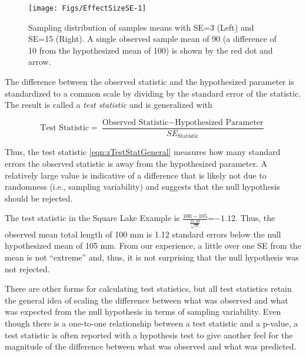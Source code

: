 \documentclass[10pt,openany]{book}\usepackage[]{graphicx}\usepackage[]{color}
\newenvironment{knitrout}{}{} %
\begin{document}
\begin{knitrout}
\color{fgcolor}\begin{figure}[hbtp]

{\centering \texttt{[image: Figs/EffectSizeSE-1]} 

}

\caption[Sampling distribution of samples means with SE=3 (Left) and SE=15 (Right)]{Sampling distribution of samples means with SE=3 (Left) and SE=15 (Right). A single observed sample mean of 90 (a difference of 10 from the hypothesized mean of 100) is shown by the red dot and arrow.}\label{fig:EffectSizeSE}
\end{figure}


\end{knitrout}

The difference between the observed statistic and the hypothesized parameter is  standardized to a common scale by dividing by the standard error of the statistic. The result is called a \emph{test statistic} and is generalized with

\begin{equation}  \label{eqn:zTestStatGeneral}
  \text{Test Statistic} = \frac{\text{Observed Statistic}-\text{Hypothesized Parameter}}{SE_{\text{Statistic}}}
\end{equation}

Thus, the test statistic \eqref{eqn:zTestStatGeneral} measures how many standard errors the observed statistic is away from the hypothesized parameter. A relatively large value is indicative of a difference that is likely not due to randomness (i.e., sampling variability) and suggests that the null hypothesis should be rejected.

The test statistic in the Square Lake Example is $\frac{100-105}{\frac{31.49}{\sqrt{50}}}$=$-1.12$. Thus, the observed mean total length of 100 mm is 1.12 standard errors below the null hypothesized mean of 105 mm. From our experience, a little over one SE from the mean is not ``extreme'' and, thus, it is not surprising that the null hypothesis was not rejected.

There are other forms for calculating test statistics, but all test statistics retain the general idea of scaling the difference between what was observed and what was expected from the null hypothesis in terms of sampling variability. Even though there is a one-to-one relationship between a test statistic and a p-value, a test statistic is often reported with a hypothesis test to give another feel for the magnitude of the difference between what was observed and what was predicted.
\end{document}
